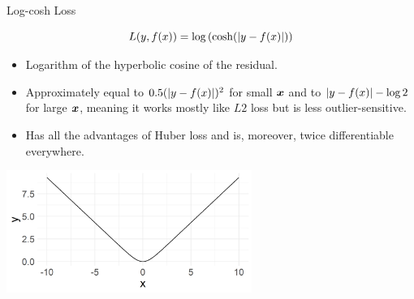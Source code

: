 \begin{vbframe}{Log-cosh Loss}


$$
L(y, f(x)) = \log \left( \cosh(\left|y - f(x)\right|) \right)
$$

\normalsize
\begin{itemize}
\item Logarithm of the hyperbolic cosine of the residual.
\item Approximately equal to $0.5 (\left|y - f(x)\right|)^2$ for small $\bm{x}$ and to $\left|y - f(x)\right| - \log 2$ for large $\bm{x}$, meaning it works mostly like $L2$ loss but is less outlier-sensitive.
\item Has all the advantages of Huber loss and is, moreover, twice differentiable everywhere.
\end{itemize}

\vfill

\begin{center}
\includegraphics[width = 0.6\textwidth]{figure/loss_logcosh.png}
\end{center}

\end{vbframe}


\endlecture

